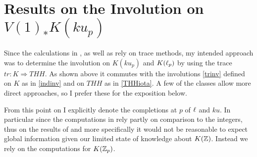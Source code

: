{}

\section{Results on the Involution on $V(1)_*K(ku_p)$}
Since the calculations in \cite{AuKku}, as well as \cite{AuKl1,AuKl2} rely
on trace methods, my intended approach was to determine the involution
on $K(ku_p)$ and $K(\ell_p)$ by using the trace $tr\colon K\Rightarrow THH$. As
shown above it commutes with the involutions \ref{trinv} defined
on $K$ as in \ref{indinv} and on $THH$ as in \ref{THHiota}. A few of 
the classes allow more direct approaches, so I prefer these for the 
exposition below.

From this point on I explicitly denote the completions at $p$ of $\ell$ and $ku$.
In particular since the computations in \cite{AuKl1,AuKku} rely partly on
comparison to the integers, thus on the results of \cite{BHMtr} and more
specifically \cite{BMTCZ} it would not be reasonable to expect global information
given our limited state of knowledge about $K(\mathbb{Z})$.
Instead we rely on the computations for $K(\mathbb{Z}_p)$.

